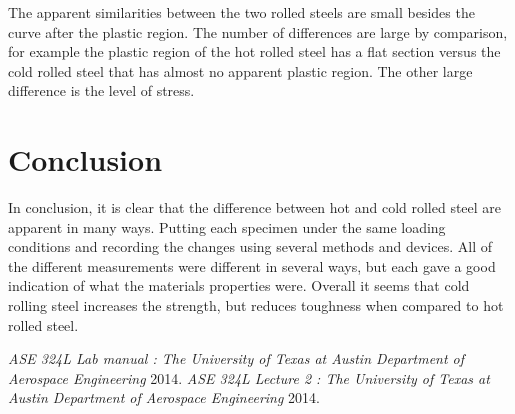 \documentclass[12pt]{report}
\begin{document}
The apparent similarities between the two rolled steels are small besides the curve after the plastic region. The number of differences are large by comparison, for example the plastic region of the hot rolled steel has a flat section versus the cold rolled steel that has almost no apparent plastic region. The other large difference is the level of stress. 

\section{Conclusion}
\doublespacing
In conclusion, it is clear that the difference between hot and cold rolled steel are apparent in many ways. Putting each specimen under the same loading conditions and recording the changes using several methods and devices. All of the different measurements were different in several ways, but each gave a good indication of what the materials properties were. Overall it seems that cold rolling steel increases the strength, but reduces toughness when compared to hot rolled steel. 




\begin{thebibliography}{0}
 {\em ASE 324L Lab manual : The University of Texas at Austin Department of Aerospace Engineering}  2014.
 {\em ASE 324L Lecture 2 : The University of Texas at Austin Department of Aerospace Engineering}  2014.
\end{thebibliography}
\end{document}
